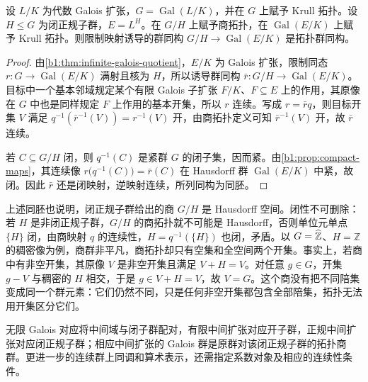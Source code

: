 \begin{proposition}\label{b1:prop:galois-quotient-homeomorphism}
	设 \(L/K\) 为代数 Galois 扩张，\(G=\operatorname{Gal}(L/K)\)，并在 \(G\) 上赋予 Krull 拓扑。设 \(H\leq G\) 为闭正规子群，\(E=L^H\)。在 \(G/H\) 上赋予商拓扑，在 \(\operatorname{Gal}(E/K)\) 上赋予 Krull 拓扑。则限制映射诱导的群同构 \(G/H\rightarrow\operatorname{Gal}(E/K)\) 是拓扑群同构。
\end{proposition}
\begin{proof}
	由\cref{b1:thm:infinite-galois-quotient}，\(E/K\) 为 Galois 扩张，限制同态 \(r:G\rightarrow\operatorname{Gal}(E/K)\) 满射且核为 \(H\)，所以诱导群同构 \(\bar r:G/H\rightarrow\operatorname{Gal}(E/K)\)。目标中一个基本邻域规定某个有限 Galois 子扩张 \(F/K\)、\(F\subseteq E\) 上的作用，其原像在 \(G\) 中也是同样规定 \(F\) 上作用的基本开集，所以 \(r\) 连续。写成 \(r=\bar r q\)，则目标开集 \(V\) 满足 \(q^{-1}(\bar r^{-1}(V))=r^{-1}(V)\) 开，由商拓扑定义可知 \(\bar r^{-1}(V)\) 开，故 \(\bar r\) 连续。

	若 \(C\subseteq G/H\) 闭，则 \(q^{-1}(C)\) 是紧群 \(G\) 的闭子集，因而紧。由\cref{b1:prop:compact-maps}，其连续像 \(r\bigl(q^{-1}(C)\bigr)=\bar r(C)\) 在 Hausdorff 群 \(\operatorname{Gal}(E/K)\) 中紧，故闭。因此 \(\bar r\) 还是闭映射，逆映射连续，所列同构为同胚。
\end{proof}
上述同胚也说明，闭正规子群给出的商 \(G/H\) 是 Hausdorff 空间。闭性不可删除：若 \(H\) 是非闭正规子群，\(G/H\) 的商拓扑就不可能是 Hausdorff，否则单位元单点 \(\{H\}\) 闭，由商映射 \(q\) 的连续性，\(H=q^{-1}(\{H\})\) 也闭，矛盾。以 \(G=\widehat{\vphantom{Z}\mathbb Z}\)、\(H=\mathbb Z\) 的稠密像为例，商群非平凡，商拓扑却只有空集和全空间两个开集。事实上，若商中有非空开集，其原像 \(V\) 是非空开集且满足 \(V+H=V\)。对任意 \(g\in G\)，开集 \(g-V\) 与稠密的 \(H\) 相交，于是 \(g\in V+H=V\)，故 \(V=G\)。这个商没有把不同陪集变成同一个群元素：它们仍然不同，只是任何非空开集都包含全部陪集，拓扑无法用开集区分它们。

\ProseParagraphBreak
无限 Galois 对应将中间域与闭子群配对，有限中间扩张对应开子群，正规中间扩张对应闭正规子群；相应中间扩张的 Galois 群是原群对该闭正规子群的拓扑商群。更进一步的连续群上同调和算术表示，还需指定系数对象及相应的连续性条件。
